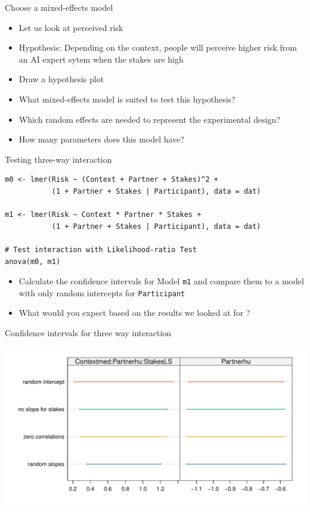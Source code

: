 \documentclass[aspectratio=169]{beamer}
\begin{document}
\begin{frame}[<+->]{Choose a mixed-effects model}
  \begin{itemize}
    \item Let us look at perceived risk
    \item Hypothesis: Depending on the context, people will perceive higher risk
      from an AI expert sytem when the stakes are high
    \item Draw a hypothesis plot
    \item What mixed-effects model is suited to test this hypothesis?
    \item Which random effects are needed to represent the experimental design?
    \item How many parameters does this model have?
  \end{itemize}
\end{frame}

\begin{frame}[fragile]{Testing three-way interaction}
  \begin{lstlisting}
m0 <- lmer(Risk ~ (Context + Partner + Stakes)^2 +
           (1 + Partner + Stakes | Participant), data = dat)

m1 <- lmer(Risk ~ Context * Partner * Stakes +
           (1 + Partner + Stakes | Participant), data = dat)

# Test interaction with Likelihood-ratio Test
anova(m0, m1)
  \end{lstlisting}
  \pause
  \begin{itemize}
    \item Calculate the confidence intervals for Model \texttt{m1} and compare
      them to a model with only random intercepts for \texttt{Participant}
    \item What would you expect based on the results we looked at for
      \citet{Aungle2023}?
  \end{itemize}
\end{frame}

\begin{frame}{Confidence intervals for three way interaction}
  \begin{center}
    \includegraphics[scale=.7]{../figures/nico_cis_data-risk}
  \end{center}
\end{frame}
\end{document}
